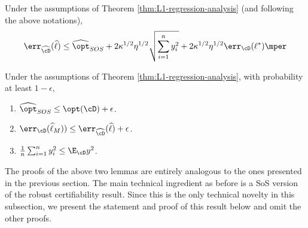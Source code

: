 \begin{lemma} \label{lem:opt-error-L1}
Under the assumptions of Theorem \ref{thm:L1-regression-analysis} (and following the above notations), 
$$\err_{\widehat{\cD}}(\widehat{\ell}) \leq \widehat{\opt}_{SOS} + 2 \kappa^{1/2} \eta^{1/2} \sqrt{\sum_{i =1}^n y_i^2} + 2 \kappa^{1/2} \eta^{1/2} \err_{\cD}(\ell^{*})\mper$$ 


\end{lemma}



\begin{lemma}
Under the assumptions of Theorem \ref{thm:L1-regression-analysis}, with probability at least $1-\epsilon$, 
\begin{enumerate}
\item $\widehat{\opt}_{SOS}  \leq \opt(\cD) + \epsilon$.

\item $\err_{\cD}(\widehat{\ell}_M)) \leq \err_{\widehat{\cD}}(\widehat{\ell}) + \epsilon$.

\item $\frac{1}{n} \sum_{i = 1}^n y_i^2 \leq \E_{\cD} y^2$.
\end{enumerate}
\end{lemma}

The proofs of the above two lemmas are entirely analogous to the ones presented in the previous section. The main technical ingredient as before is a SoS version of the robust certifiability result. Since this is the only technical novelty in this subsection, we present the statement and proof of this result below and omit the other proofs. 



